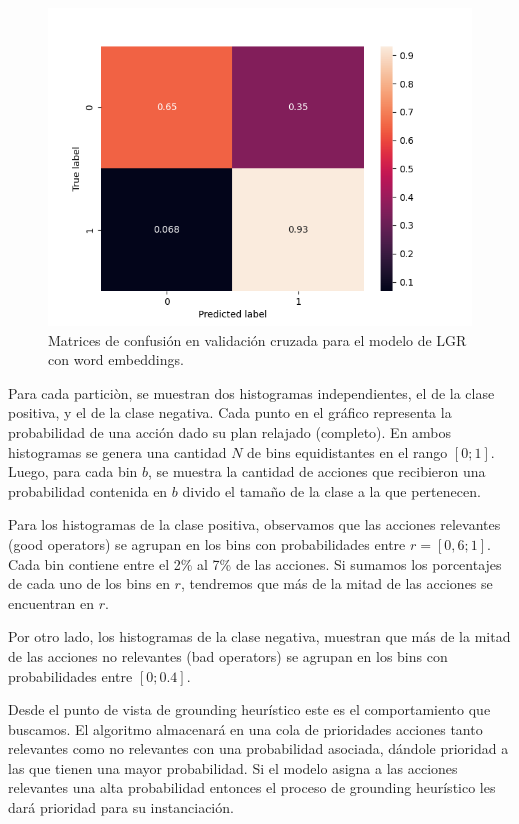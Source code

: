 \begin{figure}[b!]
      \includegraphics[width=\linewidth]{figures/results/word_embeddings/lgr/take_image/lgr_set_5_confusion_matrix_percent.png}
    \endminipage
    \caption{Matrices de confusión en validación cruzada para el modelo de LGR con word embeddings.}
    \label{fig:takeimage-bestmodel-cm}
\end{figure}

Para cada particiòn, se muestran dos histogramas independientes, el de la clase
positiva, y el de la clase negativa. Cada punto en el gráfico representa la
probabilidad de una acción dado su plan relajado (completo). En ambos
histogramas se genera una cantidad $N$ de bins equidistantes en el rango $[0;1]$.
Luego, para cada bin $b$, se muestra la cantidad de acciones que recibieron una
probabilidad contenida en $b$ divido el tamaño de la clase a la que pertenecen.

Para los histogramas de la clase positiva, observamos que las acciones relevantes
(good operators) se agrupan en los bins con probabilidades entre $r=[0,6; 1]$.
Cada bin contiene entre el 2\% al 7\% de las acciones. Si sumamos los
porcentajes de cada uno de los bins en $r$, tendremos que más de la mitad de las
acciones se encuentran en $r$.

Por otro lado, los histogramas de la clase negativa, muestran que más de la mitad
de las acciones no relevantes (bad operators) se agrupan en los bins con
probabilidades entre $[0;0.4]$.

Desde el punto de vista de grounding heurístico este es el comportamiento que
buscamos. El algoritmo almacenará en una cola de prioridades acciones tanto
relevantes como no relevantes con una probabilidad asociada, dándole prioridad a
las que tienen una mayor probabilidad. Si el modelo asigna a las acciones
relevantes una alta probabilidad entonces el proceso de grounding heurístico les
dará prioridad para su instanciación.

